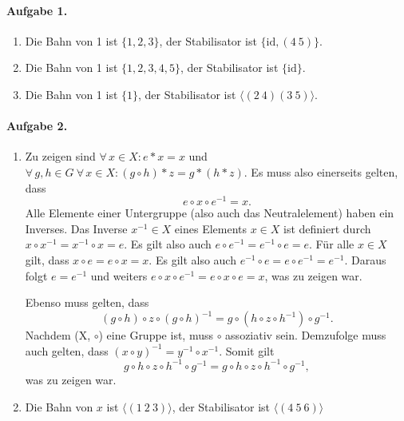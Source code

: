 \documentclass{article}
\begin{document}
\paragraph{Aufgabe 1.}

\begin{enumerate}
    \item Die Bahn von 1 ist $\{ 1, 2, 3 \}$, der Stabilisator ist $\{ \text{id}, (4\ 5) \}$.
    
    \item Die Bahn von 1 ist $\{ 1, 2, 3, 4, 5 \}$, der Stabilisator ist $\{ \text{id} \}$.
    
    \item Die Bahn von 1 ist $\{ 1 \}$, der Stabilisator ist $\langle(2\ 4)(3\ 5)\rangle$.
\end{enumerate}

\paragraph{Aufgabe 2.}

\begin{enumerate}
    \item Zu zeigen sind $\forall\, x \in X : e * x = x$ und $\forall\, g, h \in G\ \forall\, x \in X : (g \circ h) * z = g * (h * z)$. Es muss also einerseits gelten, dass
    \begin{equation*}
        e \circ x \circ e^{-1} = x.
    \end{equation*}
    Alle Elemente einer Untergruppe (also auch das Neutralelement) haben ein Inverses. Das Inverse $x^{-1} \in X$ eines Elements $x \in X$ ist definiert durch $x \circ x^{-1} = x^{-1} \circ x = e$. Es gilt also auch $e \circ e^{-1} = e^{-1} \circ e = e$. Für alle $x \in X$ gilt, dass $x \circ e = e \circ x = x$. Es gilt also auch $e^{-1} \circ e = e \circ e^{-1} = e^{-1}$. Daraus folgt $e = e^{-1}$ und weiters $e \circ x \circ e^{-1} = e \circ x \circ e = x$, was zu zeigen war.

    Ebenso muss gelten, dass
    \begin{equation*}
        (g \circ h) \circ z \circ (g \circ h)^{-1} = g \circ (h \circ z \circ h^{-1}) \circ g^{-1}.
    \end{equation*}
    Nachdem (X, $\circ$) eine Gruppe ist, muss $\circ$ assoziativ sein. Demzufolge muss auch gelten, dass $(x \circ y)^{-1} = y^{-1} \circ x^{-1}$. Somit gilt
    \begin{equation*}
        g \circ h \circ z \circ h^{-1} \circ g^{-1} = g \circ h \circ z \circ h^{-1} \circ g^{-1},
    \end{equation*}
    was zu zeigen war.

    \item Die Bahn von $x$ ist $\langle(1\ 2\ 3)\rangle$, der Stabilisator ist $\langle(4\ 5\ 6)\rangle$
\end{enumerate}
\end{document}
